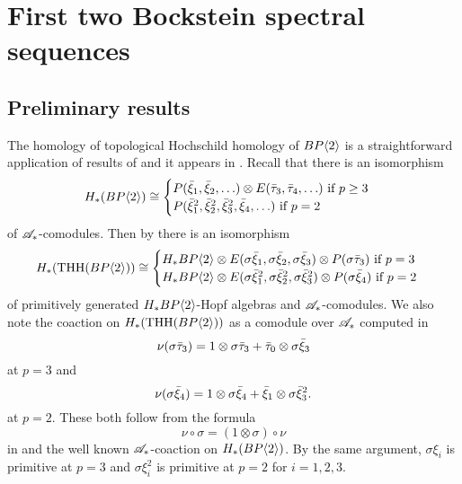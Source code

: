 
\section{First two Bockstein spectral sequences}

\subsection{Preliminary results}\label{sec prelim}
The homology of topological Hochschild homology of $BP\langle 2 \rangle$ is a straightforward application of results of \cites{BMMS86,Bok85,AngeltveitRognes} and it appears in \cite[Thm. 5.12]{AngeltveitRognes}. Recall that there is an isomorphism
\[H_*(BP\langle 2 \rangle)\cong \begin{cases} P(\bar{\xi}_1,\bar{\xi}_2,\ldots )\otimes E(\bar{\tau}_{3},\bar{\tau}_4,\ldots) \text{ if } p \ge 3 \\ P(\bar{\xi}_1^2,\bar{\xi}_2^2,\bar{\xi}_3^2,\bar{\xi}_4,\ldots) \text{ if } p=2 \end{cases}\]
of $\mathscr{A}_*$-comodules. Then by \cite[Thm. 5.12, Cor. 5.12]{AngeltveitRognes} there is an isomorphism
\begin{equation}\label{HTHHB} H_*(\operatorname{THH}(BP\langle 2 \rangle))\cong \begin{cases} H_*BP\langle 2 \rangle \otimes E(\sigma{\bar{\xi}_1},\sigma{\bar{\xi}_2},\sigma{\bar{\xi}_3})\otimes P(\sigma{\bar{\tau}_3})\text{ if } p = 3 \\ H_*BP\langle 2 \rangle\otimes E(\sigma{\bar{\xi}^2_1},\sigma{\bar{\xi}^2_2},\sigma{\bar{\xi}^2_3})\otimes P(\sigma{\bar{\xi}_4}) \text{ if }p=2\end{cases}\end{equation}
of primitively generated $H_*BP\langle 2 \rangle$-Hopf algebras and $\mathscr{A}_*$-comodules. We also note the coaction on $H_*(\operatorname{THH}(BP\langle 2 \rangle))$ as a comodule over $\mathscr{A}_*$ computed in \cite[Thm. 5.12]{AngeltveitRognes}
\begin{equation}\label{coactp>2}\nu ( \sigma{\bar{\tau}_3}) = 1\otimes \sigma \bar{\tau}_3 + \bar{\tau}_0\otimes\sigma{\bar{\xi}_3}\end{equation}
at $p = 3$ and 
\begin{equation}\label{coactp=2} \nu(\sigma{\bar{\xi}_{4}})=1\otimes\sigma{\bar{\xi}_{4}}+\bar{\xi}_1\otimes\sigma\bar{\xi}_3^2.\end{equation}
at $p=2$. These both follow from the formula
\begin{equation}\label{coactsigma} \nu \circ \sigma = (1\otimes \sigma)\circ \nu \end{equation}
in \cite[Eq. 5.11]{AngeltveitRognes} and the well known $\mathscr{A}_*$-coaction on $H_*(BP\langle 2 \rangle)$. By the same argument, $\sigma \xi_i$ is primitive at $p=3$ and $\sigma \xi_i^2$ is primitive at $p=2$ for $i=1,2,3$.
